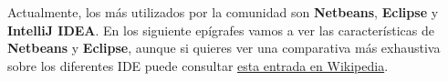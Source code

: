 Actualmente, los más utilizados por la comunidad son \textbf{Netbeans}, \textbf{Eclipse} y \textbf{IntelliJ IDEA}. En los siguiente epígrafes vamos a ver las características de \textbf{Netbeans} y \textbf{Eclipse}, aunque si quieres ver una comparativa más exhaustiva sobre los diferentes IDE puede consultar \href{https://en.wikipedia.org/wiki/Comparison_of_integrated_development_environments#Java}{esta entrada en Wikipedia}.



\newpage
{}



